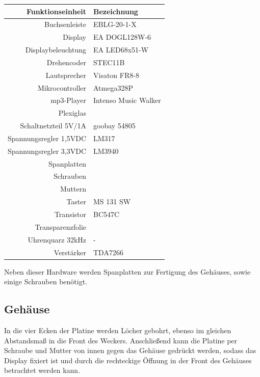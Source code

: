 \documentclass[journal, a4paper]{IEEEtran}
\begin{document}
		\begin{center}
			\begin{tabular}{rl}
				\toprule
				Funktionseinheit & Bezeichnung \\
				\midrule
				Buchsenleiste & EBLG-20-1-X\\
				Display & EA DOGL128W-6 \\
				Displaybeleuchtung & EA LED68x51-W\\
				Drehencoder & STEC11B \\
				Lautsprecher & Visaton FR8-8 \\
				Mikrocontroller & Atmega328P \\
				mp3-Player & Intenso Music Walker \\
				Plexiglas & \\
				Schaltnetzteil 5V/1A & goobay 54805 \\
				Spannungsregler 1,5VDC & LM317\\
				Spannungsregler 3,3VDC & LM3940 \\
				Spanplatten & \\
				Schrauben &\\
				Muttern&\\
				Taster & MS 131 SW \\
				Transistor & BC547C \\
				Transparenzfolie & \\
				Uhrenquarz 32kHz& - \\			
				Verstärker & TDA7266 \\
				\bottomrule		
			\end{tabular}
			\label{tab:Bauteile}
		\end{center}
		Neben dieser Hardware werden Spanplatten zur Fertigung des Gehäuses, sowie einige Schrauben benötigt.

	\subsection{Gehäuse}
	\label{sc:Hardware:subsc:Gehäuse}
	In die vier Ecken der Platine werden Löcher gebohrt, ebenso im gleichen Abstandsmaß in die Front des Weckers. Anschließend kann die Platine per Schraube und Mutter von innen gegen das Gehäuse gedrückt werden, sodass das Display fixiert ist und durch die rechteckige Öffnung in der Front des Gehäuses betrachtet werden kann.
		
\end{document}
